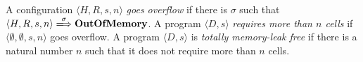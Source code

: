 \begin{myDef}
\label{df:ml}
A configuration \(\langle H, R, s, n \rangle\) \emph{goes overflow} if
there is \(\sigma\) such that \(\langle H, R, s, n \rangle
\xLongrightarrow{\sigma} \OVERFLOW\).  A program \(\langle D, s
\rangle\) \emph{requires more than \(n\) cells} if \(\langle
\emptyset, \emptyset, s, n \rangle\) goes overflow.  A program
\(\langle D, s \rangle\) is \emph{totally memory-leak free} if there
is a natural number \(n\) such that it does not require more than
\(n\) cells.
\end{myDef}
